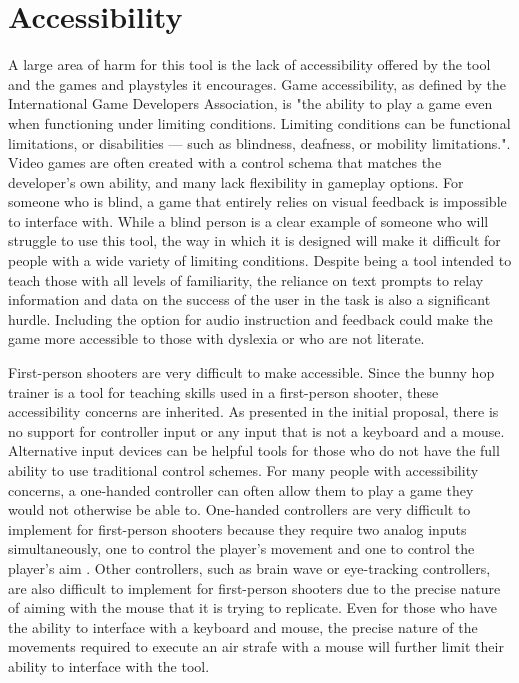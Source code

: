 \documentclass[10pt,twocolumn]{article}
\begin{document}
\section{Accessibility}

A large area of harm for this tool is the lack of accessibility offered by the tool and the games and playstyles it encourages. Game accessibility, as defined by the International Game Developers Association, is "the ability to play a game even when functioning under limiting conditions. Limiting conditions can be functional limitations, or disabilities — such as blindness, deafness, or mobility limitations."\cite{IGDA}. Video games are often created with a control schema that matches the developer's own ability, and many lack flexibility in gameplay options. For someone who is blind, a game that entirely relies on visual feedback is impossible to interface with. While a blind person is a clear example of someone who will struggle to use this tool, the way in which it is designed will make it difficult for people with a wide variety of limiting conditions. Despite being a tool intended to teach those with all levels of familiarity, the reliance on text prompts to relay information and data on the success of the user in the task is also a significant hurdle\cite{AccessInVidya}. Including the option for audio instruction and feedback could make the game more accessible to those with dyslexia or who are not literate. 

First-person shooters are very difficult to make accessible. Since the bunny hop trainer is a tool for teaching skills used in a first-person shooter, these accessibility concerns are inherited. As presented in the initial proposal, there is no support for controller input or any input that is not a keyboard and a mouse. Alternative input devices can be helpful tools for those who do not have the full ability to use traditional control schemes. For many people with accessibility concerns, a one-handed controller can often allow them to play a game they would not otherwise be able to. One-handed controllers are very difficult to implement for first-person shooters because they require two analog inputs simultaneously, one to control the player's movement and one to control the player's aim \cite{GameAccesibilityASurvey}. Other controllers, such as brain wave or eye-tracking controllers, are also difficult to implement for first-person shooters due to the precise nature of aiming with the mouse that it is trying to replicate. Even for those who have the ability to interface with a keyboard and mouse, the precise nature of the movements required to execute an air strafe with a mouse will further limit their ability to interface with the tool. 
\end{document}
